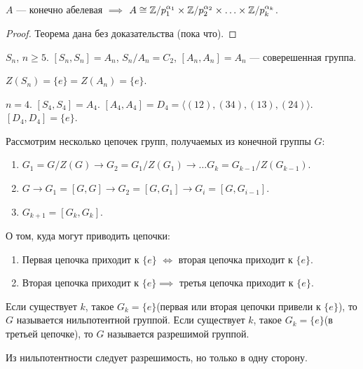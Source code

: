 \begin{theorem}
    $A$ --- конечно абелевая  $\implies$  $A \cong \mathbb{Z} / p_1^{\alpha_1} \times \mathbb{Z} / p_2^{\alpha_2} \times \ldots \times \mathbb{Z} / p_k^{\alpha_k}$.
\end{theorem}
\begin{proof}
    Теорема дана без доказательства (пока что).
\end{proof}
\begin{example}
    $S_n$,  $n \ge 5$.
    $[S_n, S_n] = A_n$,  $S_n / A_n = C_2$,  $[A_n, A_n] = A_n$ --- соверешенная группа.

     $Z(S_n) = \{e\} = Z(A_n) = \{e\}$.

     $n = 4$.  $[S_4, S_4] = A_4$.  $[A_4, A_4] = D_4 = \langle (12), (34), (13), (24) \rangle$. $[D_4, D_4] = \{e\}$.
\end{example}
\begin{example}
	Рассмотрим несколько цепочек групп, получаемых из конечной группы $G$:

	\begin{enumerate}
		\item $G_1 =G / Z(G) \to G_2 = G_1 / Z(G_1) \to \ldots G_k = G_{k-1} / Z(G_{k-1})$.

    \item $G \to G_1 = [G, G] \to G_2 = [G, G_1] \to G_i = [G, G_{i-1}]$.

    \item $G_{k+1} = [G_k, G_k]$.
\end{enumerate}
\end{example}
\begin{statement}

	О том, куда могут приводить цепочки:
    \begin{enumerate}
        \item Первая цепочка приходит к $\{e\}$ $\iff$ вторая цепочка приходит к $\{e\}$.
        \item Вторая цепочка приходит к $\{e\} \implies$ третья цепочка приходит к  $\{e\}$.
    \end{enumerate}
\end{statement}
\begin{definition}
	Если существует $k$, такое  $G_k = \{e\}$(первая или вторая цепочки привели к $\{e\}$), то  $G$ называется нильпотентной группой.
    Если существует $k$, такое  $G_k = \{e\}$(в третьей цепочке), то  $G$ называется разрешимой группой.
\end{definition}
\begin{remark}
	Из нильпотентности следует разрешимость, но только в одну сторону.
\end{remark}
